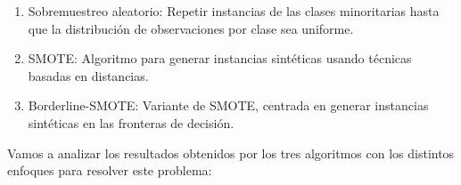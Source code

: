 \begin{enumerate}
	\item Sobremuestreo aleatorio: Repetir instancias de las clases minoritarias hasta que la distribución de observaciones por clase sea uniforme.
	\item SMOTE: Algoritmo para generar instancias sintéticas usando técnicas basadas en distancias.
	\item Borderline-SMOTE: Variante de SMOTE, centrada en generar instancias sintéticas en las fronteras de decisión.
\end{enumerate}

Vamos a analizar los resultados obtenidos por los tres algoritmos con los distintos enfoques para resolver este problema:

\begin{table}[H]
\centering
{}
\caption{Tabla resumen con los resultados de aplicar sobremuestreo aleatorio.}\label{resumenROS}
\end{table}

